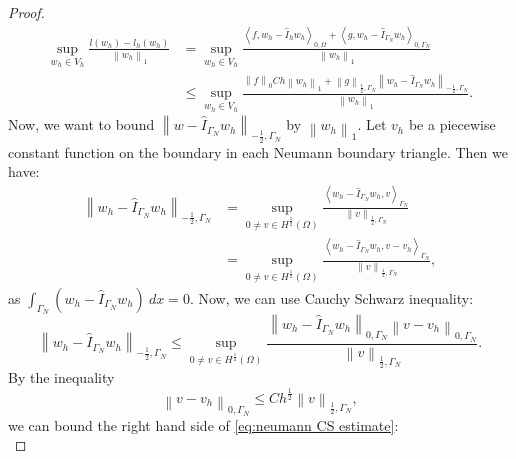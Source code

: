 \documentclass[../Main/main.tex]{subfiles}
\begin{document}
\begin{proof}
		\begin{equation}\label{eq:334}
			\begin{aligned}
				\sup_{w_h \in V_h} \frac{l(w_h)-l_h(w_h)}{\left \| w_h \right \|_1} &= \sup_{w_h \in V_h} \frac{\left \langle f,w_h-\hat{I}_h w_h \right \rangle_{0,\Omega} + \left \langle g,w_h-\hat{I}_{\Gamma_N} w_h \right \rangle_{0,\Gamma_N}}{\left \| w_h \right \|_1}\\
				&\leq \sup_{w_h \in V_h} \frac{\left \|f\right \|_0 Ch\left \|w_h \right \|_1 + \left \|g\right \|_{\frac{1}{2},\Gamma_N}\left \|w_h-\hat{I}_{\Gamma_N} w_h\right \|_{-\frac{1}{2},\Gamma_N}}{\left \| w_h \right \|_1}.
			\end{aligned}
		\end{equation}
		Now, we want to bound $\left \|w-\hat{I}_{\Gamma_N} w_h\right \|_{-\frac{1}{2},\Gamma_N}$ by $\left \| w_h \right \|_1$. Let $v_h$ be a piecewise constant function on the boundary in each Neumann boundary triangle. Then we have:
		\begin{equation}
			\begin{aligned}
				\left \|w_h-\hat{I}_{\Gamma_N} w_h\right \|_{-\frac{1}{2},\Gamma_N} &= \sup_{0 \neq v \in H^{\frac{1}{2}}(\Omega)}\frac{\left \langle w_h-\hat{I}_{\Gamma_N} w_h,v\right \rangle_{\Gamma_N}}{\left \| v \right \|_{\frac{1}{2},\Gamma_N}}\\
				&=\sup_{0 \neq v \in H^{\frac{1}{2}}(\Omega)}\frac{\left \langle w_h-\hat{I}_{\Gamma_N} w_h,v-v_h\right \rangle_{\Gamma_N}}{\left \| v\right \|_{\frac{1}{2},\Gamma_N}},
			\end{aligned}
		\end{equation}
		as $\int_{\Gamma_N} (w_h-\hat{I}_{\Gamma_N} w_h) \ dx = 0$. Now, we can use Cauchy Schwarz inequality:
		\begin{equation}\label{eq:neumann CS estimate}
			\left \|w_h-\hat{I}_{\Gamma_N} w_h\right \|_{-\frac{1}{2},\Gamma_N} \leq \sup_{0 \neq v \in H^{\frac{1}{2}}(\Omega)}\frac{\left \| w_h-\hat{I}_{\Gamma_N} w_h\right \|_{0,\Gamma_N}\left \| v-v_h\right \|_{0,\Gamma_N}}{\left \| v\right \|_{\frac{1}{2},\Gamma_N}}.
		\end{equation}
		By the inequality
		\begin{equation}\label{eq:difficult inequality}
			\left \| v-v_h\right \|_{0,\Gamma_N} \leq C h^{\frac{1}{2}} \left \| v \right \|_{\frac{1}{2}, \Gamma_N},
		\end{equation}
		we can bound the right hand side of  \eqref{eq:neumann CS estimate}: 
		\begin{equation}

\end{equation}
\end{proof}
\end{document}
